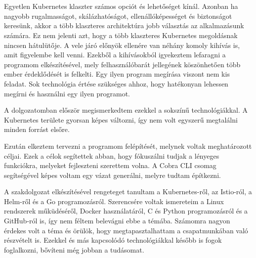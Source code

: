 \chapter{\summary}
Egyetlen Kubernetes klaszter számos opciót és lehetőséget kínál.
Azonban ha nagyobb rugalmasságot, skálázhatóságot, ellenállóképességet és biztonságot keresünk, akkor a több klaszteres architektúra jobb választás az alkalmazásunk számára.
Ez nem jelenti azt, hogy a több klaszteres Kubernetes megoldásnak nincsen hátulütője.
A vele járó előnyök ellenére van néhány komoly kihívás is, amit figyelembe kell venni.
Ezekből a kihívásokból igyekeztem lefaragni a programom elkészítésével, mely felhasználóbarát jellegének köszönhetően több ember érdeklődését is felkelti.
Egy ilyen program megírása viszont nem kis feladat.
Sok technológia értése szükséges ahhoz, hogy hatékonyan lehessen megírni és használni egy ilyen programot.

A dolgozatomban először megismerkedtem ezekkel a sokszínű technológiákkal.
A Kubernetes területe gyorsan képes változni, így nem volt egyszerű megtalálni minden forrást elsőre.

Ezután elkeztem tervezni a programom felépítését, melynek voltak meghatározott céljai.
Ezek a célok segítettek abban, hogy fókuszálni tudjak a lényeges funkciókra, melyeket fejleszteni szerettem volna.
A Cobra CLI csomag segítségével képes voltam egy vázat generálni, melyre tudtam építkezni.

A szakdolgozat elkészítésével rengeteget tanultam a Kubernetes-ről, az Istio-ról, a Helm-ről és a Go programozásról.
Szerencsére voltak ismereteim a Linux rendszerek műküdéséről, Docker használatáról, C és Python programozásról és a GitHub-ról is, így nem féltem belevágni ebbe a témába.
Számomra nagyon érdekes volt a téma és örülök, hogy megtapasztalhattam a csapatmunkában való részvételt is.
Ezekkel és más kapcsolódó technológiákkal később is fogok foglalkozni, bővíteni még jobban a tudásomat.